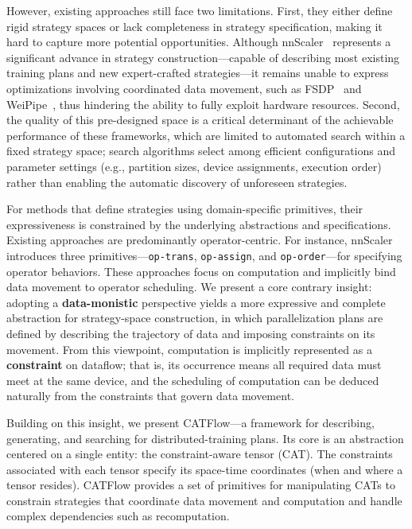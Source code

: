 \documentclass[letterpaper,twocolumn,10pt]{article}
\newcommand{\name}{CATFlow}
\begin{document}
However, existing approaches still face two limitations. First, they either define rigid strategy spaces or lack completeness in strategy specification, making it hard to capture more potential opportunities. Although nnScaler~\cite{lin2024nnscaler} represents a significant advance in strategy construction—capable of describing most existing training plans and new expert-crafted strategies—it remains unable to express optimizations involving coordinated data movement, such as FSDP~\cite{rajbhandari2020zero} and WeiPipe~\cite{lin2025weipipe}, thus hindering the ability to fully exploit hardware resources. Second, the quality of this pre-designed space is a critical determinant of the achievable performance of these frameworks, which are limited to automated search within a fixed strategy space; search algorithms select among efficient configurations and parameter settings (e.g., partition sizes, device assignments, execution order) rather than enabling the automatic discovery of unforeseen strategies.

For methods that define strategies using domain-specific primitives, their expressiveness is constrained by the underlying abstractions and specifications. Existing approaches are predominantly operator-centric. For instance, nnScaler~\cite{lin2024nnscaler} introduces three primitives—\texttt{op-trans}, \texttt{op-assign}, and \texttt{op-order}—for specifying operator behaviors. These approaches focus on computation and implicitly bind data movement to operator scheduling. We present a core contrary insight: adopting a \textbf{data-monistic} perspective yields a more expressive and complete abstraction for strategy-space construction, in which parallelization plans are defined by describing the trajectory of data and imposing constraints on its movement. From this viewpoint, computation is implicitly represented as a \textbf{constraint} on dataflow; that is, its occurrence means all required data must meet at the same device, and the scheduling of computation can be deduced naturally from the constraints that govern data movement.

Building on this insight, we present \name{}—a framework for describing, generating, and searching for distributed-training plans. Its core is an abstraction centered on a single entity: the constraint-aware tensor (CAT). The constraints associated with each tensor specify its space-time coordinates (when and where a tensor resides). \name{} provides a set of primitives for manipulating CATs to constrain strategies that coordinate data movement and computation and handle complex dependencies such as recomputation.
\end{document}
